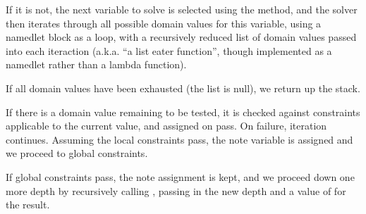 \documentclass[letterpaper,10pt,english]{sphinxmanual}
\begin{document}
\sphinxAtStartPar
If it is not, the next variable to solve is selected using the  method,
and the solver then iterates through all possible domain values for this variable,
using a named\sphinxhyphen{}let block as a loop, with a recursively reduced list of domain values
passed into each iteraction (a.k.a. “a list eater function”, though implemented as a
named\sphinxhyphen{}let rather than a lambda function).

\sphinxAtStartPar
If all domain values have been exhausted (the list is null), we return  up the stack.

\begin{sphinxVerbatim}[commandchars=\\\{\}]
\end{sphinxVerbatim}

\sphinxAtStartPar
If there is a domain value remaining to be tested, it is checked against constraints
applicable to the current value, and assigned on pass. On failure, iteration continues.
Assuming the local constraints pass, the note variable is assigned and we proceed to
global constraints.

\sphinxAtStartPar
If global constraints pass, the note assignment is kept, and we proceed down one more
depth by recursively calling , passing in the new depth and a value
of  for the result.
\end{document}
